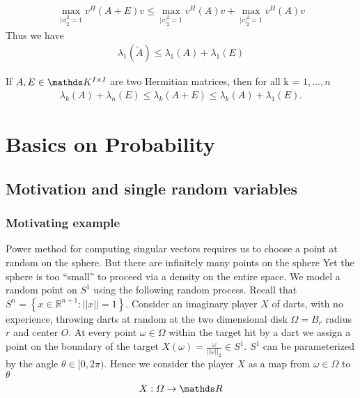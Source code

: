 \documentclass[a4paper, english, headtopline=0.08em, headsepline=0.04em, left = 1cm, right = 1cm, DIV=15]{article}
\begin{document}
\begin{align*}
	\max_{|v|^2_{2}=1}v^{H}(A+E)v \leq \max_{|v|^2_{2}=1}v^{H}(A)v + \max_{|v|^2_{2}=1}v^{H}(A)v 
\end{align*}
Thus we have 
\begin{align*}
	\lambda_1(\tilde A) \leq \lambda_1(A) + \lambda_1(E)
\end{align*}
\begin{theorem}[Weyl]
	If $A,E \in \KK^{I \times I}$ are two Hermitian matrices, then for all k = $1, ..., n$
	\begin{align*}
		\lambda_{k}(A)+\lambda_{n}(E)\leq\lambda_{k}(A+E)\leq\lambda_{k}(A)+\lambda_{1}(E).
	\end{align*}
\end{theorem}


\section{Basics on Probability}
\subsection{Motivation and single random variables}
\subsubsection*{Motivating example}
Power method for computing singular vectors requires
us to choose a point at random on the sphere. But there are infinitely many points on the sphere
Yet the sphere is too “small” to proceed via a density on the
entire space. We model a random point on $S^1$ using the following random
process. Recall that $S^{n}=\left\{x\in\mathbb{R}^{n+1}:||x||=1\right\}$. \newline
Consider an imaginary player $X$ of darts, with no
experience, throwing darts at random at the two
dimensional disk $\Omega = B_r$ radius $r$ and center $O$.
At every point $\omega \in \Omega$ within the target hit by a dart we
assign a point on the boundary of the target $X(\omega) = \frac{\omega}{||\omega||_2} \in S^1$. $S^1$
can be parameterized by the angle $\theta \in [0,2\pi)$. Hence we consider the player $X$ as
a map from $\omega\in\Omega$ to $\theta$
\begin{align*}
	X: \Omega \rightarrow \RR
\end{align*}
\end{document}
